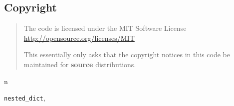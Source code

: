 \documentclass[letterpaper,10pt,english]{sphinxmanual}
\begin{document}
\subsection{Copyright}
\label{nested_dict:copyright}\begin{quote}

The code is licensed under the MIT Software License
\href{http://opensource.org/licenses/MIT}{http://opensource.org/licenses/MIT}

This essentially only asks that the copyright notices in this code be maintained
for \textbf{source} distributions.
\end{quote}


\renewcommand{\indexname}{Python Module Index}
\begin{theindex}
\def\bigletter#1{{\Large\sffamily#1}\nopagebreak\vspace{1mm}}
\bigletter{n}
\item {\texttt{nested\_dict}}, \pageref{nested_dict:module-nested_dict}
\end{theindex}

\renewcommand{\indexname}{Index}
\printindex
\end{document}
